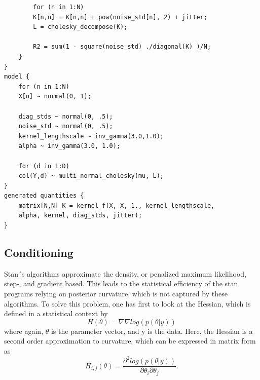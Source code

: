 \begin{lstlisting}
		for (n in 1:N)
		K[n,n] = K[n,n] + pow(noise_std[n], 2) + jitter;
		L = cholesky_decompose(K);
		
		R2 = sum(1 - square(noise_std) ./diagonal(K) )/N;
	}
}
model {
	for (n in 1:N)
	X[n] ~ normal(0, 1);
	
	diag_stds ~ normal(0, .5);
	noise_std ~ normal(0, .5);
	kernel_lengthscale ~ inv_gamma(3.0,1.0);
	alpha ~ inv_gamma(3.0, 1.0);             
	
	for (d in 1:D) 
	col(Y,d) ~ multi_normal_cholesky(mu, L);
}
generated quantities {
	matrix[N,N] K = kernel_f(X, X, 1., kernel_lengthscale, 
	alpha, kernel, diag_stds, jitter);
}
\end{lstlisting}

\subsection{Conditioning}
Stan´s algorithms approximate the density, or penalized maximum likelihood, step-, and gradient based. This leads to the statistical efficiency of the stan programs relying on posterior curvature, which is not captured by these algorithms. To solve this problem, one has first to look at the Hessian, which is defined in a statistical context by
\begin{equation}%
	H(\theta) = \nabla \nabla log (p(\theta | y))
\label{eq: Conditioning with Hessian principle}
\end{equation}
where again, $\theta$ is the parameter vector, and y is the data. Here, the Hessian is a second order approximation to curvature, which can be expressed in matrix form as
\begin{equation}%
	H_{i,j}(\theta) = \frac{\partial^2 log (p(\theta | y))}{\partial \theta_i \partial \theta_j}.
\label{eq: Conditioning with Hessian Matrix}
\end{equation}
